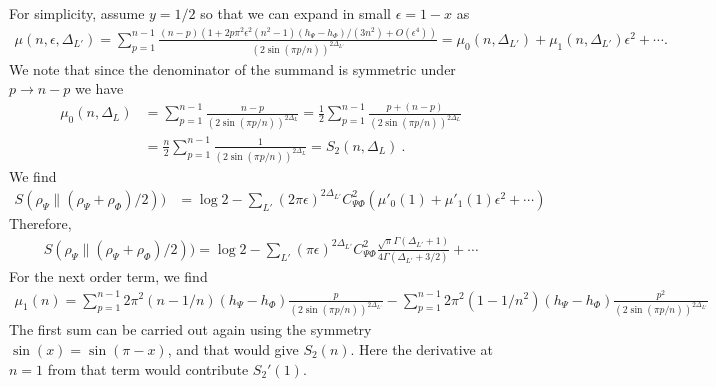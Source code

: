 \documentclass[11pt]{article}
\newcommand{\ep}{\epsilon}
\newcommand{\nn}{\nonumber}
\newcommand{\lb}{\left(}
\newcommand{\rb}{\right)}
\begin{document}
For simplicity, assume $y=1/2$ so that we can expand in small $\ep=1-x$ as
\begin{align}
  \mu(n,\ep,\Delta_{L'})=\sum_{p=1}^{n-1}\frac{(n-p)(1+2p\pi^2\ep^2(n^2-1)(h_\Psi - h_\Phi)/(3n^2)+O(\ep^4))}{(2\sin(\pi p/n))^{2\Delta_{L'}}}=\mu_0(n,\Delta_{L'})+\mu_1(n,\Delta_{L'})\ep^2+\cdots.
\end{align}
We note that since the denominator of the summand is symmetric under $p\to n-p$ we have
\begin{align}
  \mu_0(n,\Delta_{L})&=\sum_{p=1}^{n-1}\frac{n-p}{(2\sin(\pi p/n))^{2\Delta_L}}=\frac{1}{2}\sum_{p=1}^{n-1}\frac{p+(n-p)}{(2\sin(\pi p/n))^{2\Delta_L}}\nn\\
  &=\frac{n}{2}\sum_{p=1}^{n-1}\frac{1}{(2\sin(\pi p/n))^{2\Delta_L}}=S_2(n,\Delta_{L})\ .
\end{align}
We find
\begin{align}
 S(\rho_\Psi\|(\rho_\Psi+\rho_\Phi)/2))&=\log 2-\sum_{L'}(2\pi \ep)^{2\Delta_{L'}}  C_{\Psi \Phi}^2(\mu'_0(1)+\mu'_1(1)\ep^2+\cdots)
\end{align} 
Therefore,
\begin{align}
    \boxed{S(\rho_\Psi\|(\rho_\Psi+\rho_\Phi)/2))=\log 2-\sum_{L'}(\pi \ep)^{2\Delta_{L'}} C_{\Psi \Phi}^2 \frac{\sqrt{\pi}\Gamma(\Delta_{L'}+1)}{4\Gamma(\Delta_{L'}+3/2)} +\cdots}
\end{align}
For the next order term, we find
\begin{align}
    \mu_1(n) = \sum_{p=1}^{n-1}2\pi^2 \lb n-1/n\rb  (h_\Psi - h_\Phi) \frac{p}{(2\sin(\pi p/n))^{2\Delta_{L'}}} - \sum_{p=1}^{n-1}2\pi^2 (1-1/n^2) (h_\Psi- h_\Phi) \frac{p^2}{(2\sin(\pi p/n))^{2\Delta_{L'}}} 
\end{align}
The first sum can be carried out again using the symmetry $\sin(x) = \sin (\pi - x)$, and that would give $S_2(n)$. Here the derivative at $n=1$ from that term would contribute $S_2'(1)$.
\end{document}

